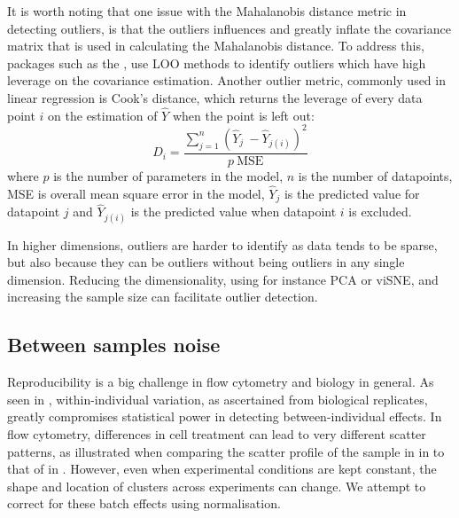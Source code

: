 It is worth noting that one issue with the Mahalanobis distance metric in detecting outliers, is that the outliers influences and greatly inflate the covariance matrix that is used in calculating the Mahalanobis distance.
To address this, packages such as the , use \gls{LOO} methods to identify outliers which have high leverage on the covariance estimation.
Another outlier metric, commonly used in linear regression is Cook's distance, which returns the leverage of every data point $i$  on the estimation of $\hat Y$ when the point is left out:
\[
D_i = \frac{ \sum_{j=1}^n (\hat Y_j\ - \hat Y_{j(i)})^2 }{p \ \mathrm{MSE}}
\]
where $p$ is the number of parameters in the model, $n$ is the number of datapoints, MSE is overall mean square error in the model, $ \hat Y_j $ is the predicted value for datapoint $j$ and $ \hat Y_{j(i)} $ is the predicted value when datapoint $i$ is excluded.

In higher dimensions, outliers are harder to identify as data tends to be sparse, but also because they can be outliers without being outliers in any single dimension.
Reducing the dimensionality, using for instance \gls{PCA} or \gls{viSNE}, and increasing the sample size can facilitate outlier detection.


\subsection{Between samples noise}


Reproducibility is a big challenge in flow cytometry and biology in general.
As seen in , within-individual variation, as ascertained from biological replicates, greatly compromises statistical power in detecting between-individual effects.
In flow cytometry, differences in cell treatment can lead to very different scatter patterns, as illustrated when comparing the scatter profile of the sample in  in  to that of  in .
However, even when experimental conditions are kept constant,
the shape and location of clusters across experiments can change.
We attempt to correct for these batch effects using normalisation.

